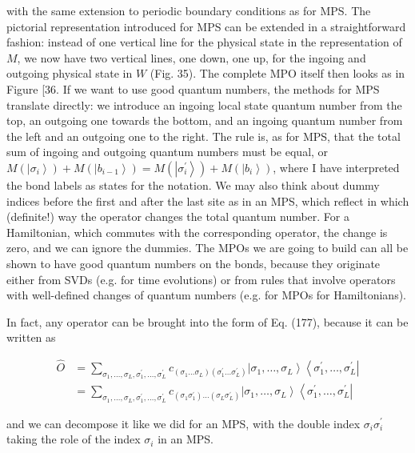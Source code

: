 \documentclass[12pt]{article}
\begin{document}
with the same extension to periodic boundary conditions as for MPS. The pictorial representation introduced for MPS can be extended in a straightforward fashion: instead of one vertical line for the physical state in the representation of $M$, we now have two vertical lines, one down, one up, for the ingoing and outgoing physical state in $W$ (Fig. 35). The complete MPO itself then looks as in Figure [36. If we want to use good quantum numbers, the methods for MPS translate directly: we introduce an ingoing local state quantum number from the top, an outgoing one towards the bottom, and an ingoing quantum number from the left and an outgoing one to the right. The rule is, as for MPS, that the total sum of ingoing and outgoing quantum numbers must be equal, or $M\left(\left|\sigma_{i}\right\rangle\right)+M\left(\left|b_{i-1}\right\rangle\right)=M\left(\left|\sigma_{i}^{\prime}\right\rangle\right)+M\left(\left|b_{i}\right\rangle\right)$, where I have interpreted the bond labels as states for the notation. We may also think about dummy indices before the first and after the last site as in an MPS, which reflect in which (definite!) way the operator changes the total quantum number. For a Hamiltonian, which commutes with the corresponding operator, the change is zero, and we can ignore the dummies. The MPOs we are going to build can all be shown to have good quantum numbers on the bonds, because they originate either from SVDs (e.g. for time evolutions) or from rules that involve operators with well-defined changes of quantum numbers (e.g. for MPOs for Hamiltonians).

In fact, any operator can be brought into the form of Eq. (177), because it can be written as


\begin{align*}
\hat{O} & =\sum_{\sigma_{1}, \ldots, \sigma_{L}, \sigma_{1}^{\prime}, \ldots, \sigma_{L}^{\prime}} c_{\left(\sigma_{1} \ldots \sigma_{L}\right)\left(\sigma_{1}^{\prime} \ldots \sigma_{L}^{\prime}\right)}\left|\sigma_{1}, \ldots, \sigma_{L}\right\rangle\left\langle\sigma_{1}^{\prime}, \ldots, \sigma_{L}^{\prime}\right| \\
& =\sum_{\sigma_{1}, \ldots, \sigma_{L}, \sigma_{1}^{\prime}, \ldots, \sigma_{L}^{\prime}} c_{\left(\sigma_{1} \sigma_{1}^{\prime}\right) \ldots\left(\sigma_{L} \sigma_{L}^{\prime}\right)}\left|\sigma_{1}, \ldots, \sigma_{L}\right\rangle\left\langle\sigma_{1}^{\prime}, \ldots, \sigma_{L}^{\prime}\right| \tag{178}
\end{align*}


and we can decompose it like we did for an MPS, with the double index $\sigma_{i} \sigma_{i}^{\prime}$ taking the role of the index $\sigma_{i}$ in an MPS.
\end{document}

